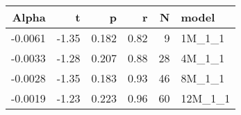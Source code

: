 \begin{table}[ht]
\centering
\begin{tabular}{rrrrrl}
  \hline
Alpha & t & p & r & N & model \\ 
  \hline
-0.0061 & -1.35 & 0.182 & 0.82 & 9 & 1M\_1\_1 \\ 
  -0.0033 & -1.28 & 0.207 & 0.88 & 28 & 4M\_1\_1 \\ 
  -0.0028 & -1.35 & 0.183 & 0.93 & 46 & 8M\_1\_1 \\ 
  -0.0019 & -1.23 & 0.223 & 0.96 & 60 & 12M\_1\_1 \\ 
   \hline
\end{tabular}
\end{table}

